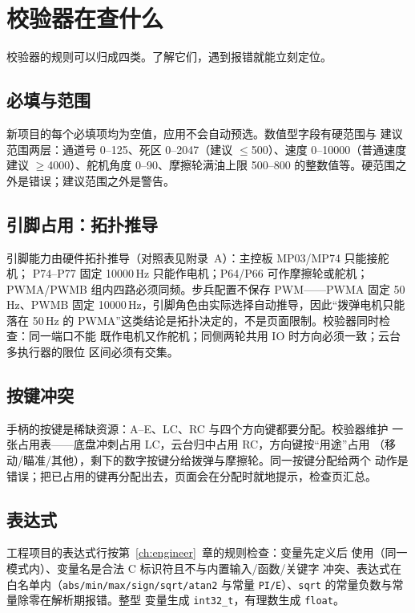 \section{校验器在查什么}

校验器的规则可以归成四类。了解它们，遇到报错就能立刻定位。

\subsection{必填与范围}

新项目的每个必填项均为空值，应用不会自动预选。数值型字段有硬范围与
建议范围两层：通道号 0--125、死区 0--2047（建议 $\le$500）、速度
0--10000（普通速度建议 $\ge$4000）、舵机角度 0--90、摩擦轮满油上限
500--800 的整数值等。硬范围之外是错误；建议范围之外是警告。

\subsection{引脚占用：拓扑推导}

引脚能力由硬件拓扑推导（对照表见附录~A）：主控板 MP03/MP74 只能接舵机；
P74--P77 固定 10000\,Hz 只能作电机；P64/P66 可作摩擦轮或舵机；PWMA/PWMB
组内四路必须同频。步兵配置不保存 PWM——PWMA 固定 50\,Hz、PWMB 固定
10000\,Hz，引脚角色由实际选择自动推导，因此“拨弹电机只能落在 50\,Hz 的
PWMA”这类结论是拓扑决定的，不是页面限制。校验器同时检查：同一端口不能
既作电机又作舵机；同侧两轮共用 IO 时方向必须一致；云台多执行器的限位
区间必须有交集。

\subsection{按键冲突}

手柄的按键是稀缺资源：A--E、LC、RC 与四个方向键都要分配。校验器维护
一张占用表——底盘冲刺占用 LC，云台归中占用 RC，方向键按“用途”占用
（移动/瞄准/其他），剩下的数字按键分给拨弹与摩擦轮。同一按键分配给两个
动作是错误；把已占用的键再分配出去，页面会在分配时就地提示，检查页汇总。

\subsection{表达式}

工程项目的表达式行按第~\ref{ch:engineer}~章的规则检查：变量先定义后
使用（同一模式内）、变量名是合法 C 标识符且不与内置输入/函数/关键字
冲突、表达式在白名单内（\texttt{abs/min/max/sign/sqrt/atan2} 与常量
\texttt{PI/E}）、\texttt{sqrt} 的常量负数与常量除零在解析期报错。整型
变量生成 \texttt{int32\_t}，有理数生成 \texttt{float}。

